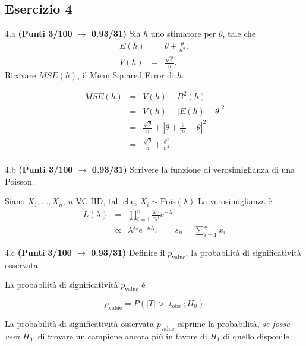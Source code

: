 \documentclass[
  11pt,
]{book}
\theoremstyle{mytheoremstyle}
\theoremstyle{mydefstyle}
\newenvironment{sol}
  {
  \begin{tcolorbox}[enhanced,breakable,arc=0.1mm,boxrule=1pt,colback=white,colframe=iblue,
  title=\bf \fontfamily{lmss}\selectfont \hspace{.5 cm} Soluzione,drop fuzzy shadow]

}{
\end{tcolorbox}
  }
\begin{document}
\subsection{Esercizio 4}\label{esercizio-4-6}

4.a \textbf{(Punti 3/100 \(\rightarrow\) 0.93/31)} Sia \(h\) uno stimatore per \(\theta\), tale che
\begin{eqnarray*}
E(h)&=&\theta+\frac\theta {n^2},\\
V(h)&=&\frac{\sqrt\theta}{ n}.
\end{eqnarray*}
Ricavare \(MSE(h)\), il Mean Squared Error di \(h\).

\begin{sol}
\begin{eqnarray*}
MSE(h)&=&V(h)+B^2(h)\\
&=&V(h)+|E(h)-\theta|^2\\
&=&\frac{\sqrt\theta}{ n}+\left|\theta+\frac\theta {n^2}-\theta\right|^2\\
&=&\frac{\sqrt\theta}{ n}+\frac{\theta^2} { n^4}\\
\end{eqnarray*}

\end{sol}

4.b \textbf{(Punti 3/100 \(\rightarrow\) 0.93/31)} Scrivere la funzione di verosimiglianza di una Poisson.

\begin{sol}
Siano \(X_1,...,X_n\), \(n\) VC IID, tali che, \(X_i\sim\text{Pois}(\lambda)\)
La verosimiglianza è
\begin{eqnarray*}
  L(\lambda) &=& \prod_{i=1}^n\frac{\lambda^{x_i}}{x_i!}e^{-\lambda}\\
             &\propto& \lambda^{s_n} e^{-n\lambda},\qquad s_n=\sum_{i=1}^n x_i
\end{eqnarray*}

\end{sol}

4.c \textbf{(Punti 3/100 \(\rightarrow\) 0.93/31)} Definire il \(p_{\text{value}}\), la probabilità di significatività osservata.

\begin{sol}
La probabilità di significatività \(p_{\text{value}}\) è

\[p_{\text{value}}=P(|T|>|t_{\text{obs}}|;H_0)\]

La probabilità di significatività osservata \(p_\text{value}\) esprime la probabilità, \emph{se fosse vera} \(H_0\),
di trovare un campione ancora più in favore di \(H_1\) di quello disponile

\end{sol}
\end{document}
